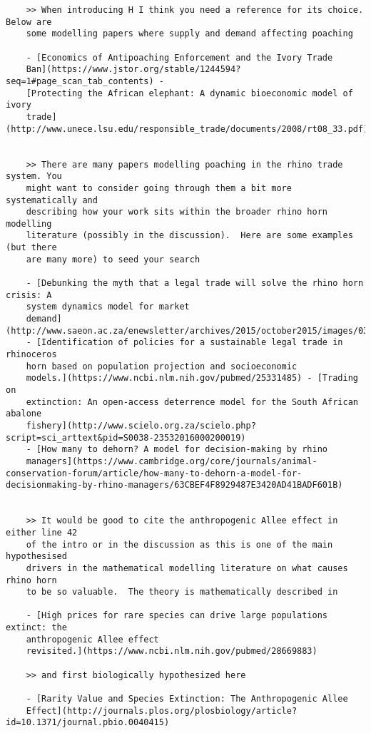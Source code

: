 \documentclass[10pt]{article}
\begin{document}
\begin{verbatim}
    >> When introducing H I think you need a reference for its choice. Below are
    some modelling papers where supply and demand affecting poaching

    - [Economics of Antipoaching Enforcement and the Ivory Trade
    Ban](https://www.jstor.org/stable/1244594?seq=1#page_scan_tab_contents) -
    [Protecting the African elephant: A dynamic bioeconomic model of ivory
    trade](http://www.unece.lsu.edu/responsible_trade/documents/2008/rt08_33.pdf)


    >> There are many papers modelling poaching in the rhino trade system. You
    might want to consider going through them a bit more systematically and
    describing how your work sits within the broader rhino horn modelling
    literature (possibly in the discussion).  Here are some examples (but there
    are many more) to seed your search

    - [Debunking the myth that a legal trade will solve the rhino horn crisis: A
    system dynamics model for market
    demand](http://www.saeon.ac.za/enewsletter/archives/2015/october2015/images/0300.pdf)
    - [Identification of policies for a sustainable legal trade in rhinoceros
    horn based on population projection and socioeconomic
    models.](https://www.ncbi.nlm.nih.gov/pubmed/25331485) - [Trading on
    extinction: An open-access deterrence model for the South African abalone
    fishery](http://www.scielo.org.za/scielo.php?script=sci_arttext&pid=S0038-23532016000200019)
    - [How many to dehorn? A model for decision-making by rhino
    managers](https://www.cambridge.org/core/journals/animal-conservation-forum/article/how-many-to-dehorn-a-model-for-decisionmaking-by-rhino-managers/63CBEF4F8929487E3420AD41BADF601B)


    >> It would be good to cite the anthropogenic Allee effect in either line 42
    of the intro or in the discussion as this is one of the main hypothesised
    drivers in the mathematical modelling literature on what causes rhino horn
    to be so valuable.  The theory is mathematically described in

    - [High prices for rare species can drive large populations extinct: the
    anthropogenic Allee effect
    revisited.](https://www.ncbi.nlm.nih.gov/pubmed/28669883)

    >> and first biologically hypothesized here

    - [Rarity Value and Species Extinction: The Anthropogenic Allee
    Effect](http://journals.plos.org/plosbiology/article?id=10.1371/journal.pbio.0040415)


\end{verbatim}
\end{document}
